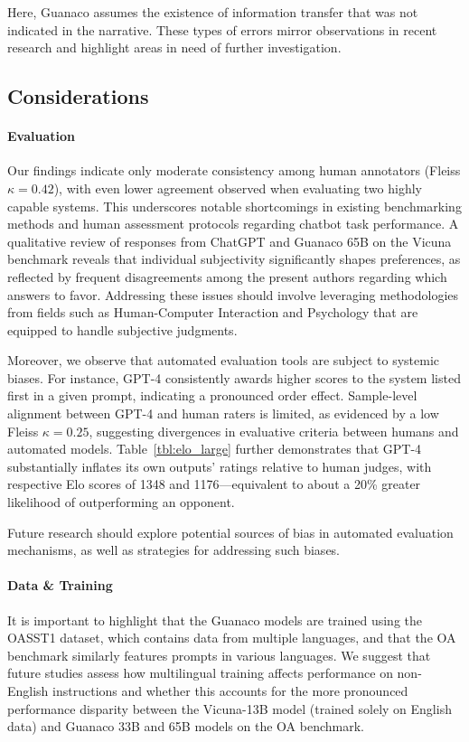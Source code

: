 Here, {Guanaco} assumes the existence of information transfer that was not indicated in the narrative. These types of errors mirror observations in recent research \cite{sap2022neural} and highlight areas in need of further investigation.

\subsection{Considerations}
\label{ssec:considerations}

\paragraph{Evaluation}

Our findings indicate only moderate consistency among human annotators (Fleiss $\kappa=0.42$), with even lower agreement observed when evaluating two highly capable systems. This underscores notable shortcomings in existing benchmarking methods and human assessment protocols regarding chatbot task performance. A qualitative review of responses from ChatGPT and {Guanaco} 65B on the Vicuna benchmark reveals that individual subjectivity significantly shapes preferences, as reflected by frequent disagreements among the present authors regarding which answers to favor. Addressing these issues should involve leveraging methodologies from fields such as Human-Computer Interaction and Psychology that are equipped to handle subjective judgments.

Moreover, we observe that automated evaluation tools are subject to systemic biases. For instance, GPT-4 consistently awards higher scores to the system listed first in a given prompt, indicating a pronounced order effect. Sample-level alignment between GPT-4 and human raters is limited, as evidenced by a low Fleiss $\kappa=0.25$, suggesting divergences in evaluative criteria between humans and automated models. Table~\ref{tbl:elo_large} further demonstrates that GPT-4 substantially inflates its own outputs’ ratings relative to human judges, with respective Elo scores of 1348 and 1176—equivalent to about a 20\% greater likelihood of outperforming an opponent.

Future research should explore potential sources of bias in automated evaluation mechanisms, as well as strategies for addressing such biases.

\paragraph{Data \& Training} It is important to highlight that the {Guanaco} models are trained using the OASST1 dataset, which contains data from multiple languages, and that the OA benchmark similarly features prompts in various languages. We suggest that future studies assess how multilingual training affects performance on non-English instructions and whether this accounts for the more pronounced performance disparity between the Vicuna-13B model (trained solely on English data) and {Guanaco} 33B and 65B models on the OA benchmark.

